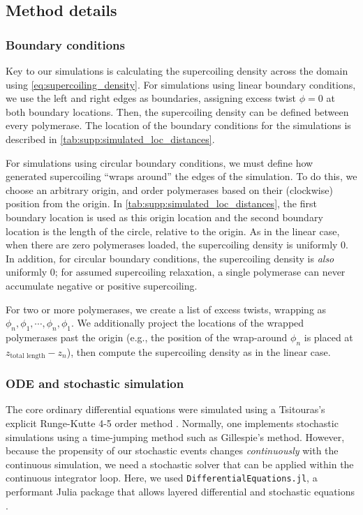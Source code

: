 \documentclass[11pt]{article}
\begin{document}
\subsection{Method details}
\subsubsection{Boundary conditions} \label{sec:appendix:bcs}

Key to our simulations is calculating the supercoiling density across the domain using \cref{eq:supercoiling_density}.
For simulations using linear boundary conditions, we use the left and right edges as boundaries, assigning excess twist \(\phi = 0\) at both boundary locations. Then, the supercoiling density can be defined between every polymerase. The location of the boundary conditions for the simulations is described in \cref{tab:supp:simulated_loc_distances}.

For simulations using circular boundary conditions, we must define how generated supercoiling ``wraps around'' the edges of the simulation. To do this, we choose an arbitrary origin, and order polymerases based on their (clockwise) position from the origin. In \cref{tab:supp:simulated_loc_distances}, the first boundary location is used as this origin location and the second boundary location is the length of the circle, relative to the origin. As in the linear case, when there are zero polymerases loaded, the supercoiling density is uniformly 0. In addition, for circular boundary conditions, the supercoiling density is \emph{also} uniformly 0; for assumed supercoiling relaxation, a single polymerase can never accumulate negative or positive supercoiling.

For two or more polymerases, we create a list of excess twists, wrapping as \(\phi_{n}, \phi_1, \cdots, \phi_n, \phi_1\). We additionally project the locations of the wrapped polymerases past the origin (e.g., the position of the wrap-around \(\phi_n\) is placed at \(z_\text{total length} - z_n\)), then compute the supercoiling density as in the linear case.

\subsubsection{ODE and stochastic simulation}
The core ordinary differential equations were simulated using a Tsitouras's explicit Runge-Kutte 4-5 order method \parencite{tsitourasRungeKuttaPairs2011}.
Normally, one implements stochastic simulations using a time-jumping method such as Gillespie's method. However, because the propensity of our stochastic events changes \emph{continuously} with the continuous simulation, we need a stochastic solver that can be applied within the continuous integrator loop. Here, we used \texttt{DifferentialEquations.jl}, a performant Julia package that allows layered differential and stochastic equations
\parencite{rackauckasDifferentialEquationsJlPerformant2017}.
\end{document}
